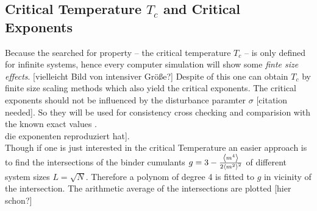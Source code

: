 \subsection{Critical Temperature $T_c$ and Critical Exponents}
    Because the searched for property -- the critical temperature \(T_c\)
    -- is only defined for infinite systems, hence every computer
    simulation will show some \emph{finte size effects}.
    [vielleicht Bild von intensiver Größe?]
    Despite of this one can obtain \(T_c\) by finite size scaling
    methods \cite[S. ??]{Newman1998} which also yield the critical
    exponents. The critical exponents should not be influenced by the
    disturbance paramter \(\sigma\) [citation needed]. So they will be
    used for consistency cross checking and comparision with the known
    exact values \cite[S. 59]{Pelissetto2002}.\\
    die exponenten reproduziert hat].\\
    Though if one is just interested in the critical Temperature an
    easier approach is to find the intersections of the binder cumulants
    \(g = 3-\frac{\left< m^4 \right>}{2\left< m^2 \right>^2}\) \cite{Binder1981} of different
    system sizes \(L=\sqrt N\).
    Therefore a polynom of degree 4 is fitted to \(g\) in vicinity of
    the intersection. %
    The arithmetic average of the intersections are plotted [hier schon?]
    \\
